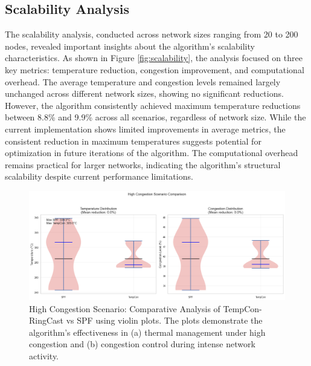 \documentclass[12pt]{article}
\begin{document}
\subsection{Scalability Analysis}
The scalability analysis, conducted across network sizes ranging from 20 to 200 nodes, revealed important insights about the algorithm's scalability characteristics. As shown in Figure \ref{fig:scalability}, the analysis focused on three key metrics: temperature reduction, congestion improvement, and computational overhead. The average temperature and congestion levels remained largely unchanged across different network sizes, showing no significant reductions. However, the algorithm consistently achieved maximum temperature reductions between 8.8\% and 9.9\% across all scenarios, regardless of network size. While the current implementation shows limited improvements in average metrics, the consistent reduction in maximum temperatures suggests potential for optimization in future iterations of the algorithm. The computational overhead remains practical for larger networks, indicating the algorithm's structural scalability despite current performance limitations.

\begin{figure}[h]
    \centering
    \includegraphics[width=\linewidth]{high_congestion_scenario_comparison.png}
    \caption{High Congestion Scenario: Comparative Analysis of TempCon-RingCast vs SPF using violin plots. The plots demonstrate the algorithm's effectiveness in (a) thermal management under high congestion and (b) congestion control during intense network activity.}
    \label{fig:high_congestion_scenario_comparison}
\end{figure}
\end{document}
